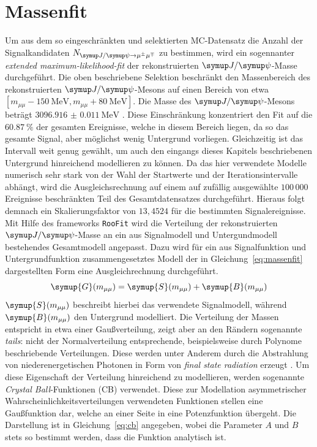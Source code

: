 \section{Massenfit}
\label{sec:massenfit}
Um aus dem so eingeschränkten und selektierten MC-Datensatz die Anzahl der Signalkandidaten $N_{\kontroll}$ zu bestimmen, wird ein sogennanter \textit{extended maximum-likelihood-fit} \cite{extended} der rekonstruierten $\jpsi$-Masse durchgeführt. Die oben
beschriebene Selektion beschränkt den Massenbereich des rekonstruierten $\jpsi$-Mesons auf einen Bereich von etwa
$[m_{\mu\mu}-\SI{150}{\mega\electronvolt}, m_{\mu\mu}+\SI{80}{\mega\electronvolt}]$. Die Masse des $\jpsi$-Mesons beträgt $\SI{3096.916(11)}{\mega\electronvolt}$ \cite{pdg}. Diese Einschränkung konzentriert den Fit auf die $\SI{60.87}{\percent}$ der gesamten Ereignisse, welche in diesem Bereich liegen, da so das gesamte Signal, aber möglichst wenig Untergrund vorliegen. Gleichzeitig ist das Intervall weit genug gewählt, um auch den eingangs dieses Kapitels beschriebenen Untergrund hinreichend modellieren zu können. Da das hier verwendete Modelle numerisch sehr stark von der Wahl der Startwerte und der Iterationsintervalle abhängt, wird die Ausgleichsrechnung auf einem auf zufällig ausgewählte $100\,000$ Ereignisse beschränkten Teil des Gesamtdatensatzes durchgeführt. Hieraus folgt demnach ein Skalierungsfaktor von $13,4524$ für die bestimmten Signalereignisse. \\
%
Mit Hilfe des frameworks \texttt{RooFit} \cite{roofit} wird die Verteilung der rekonstruierten $\jpsi$-Masse an ein aus Signalmodell und Untergundmodell bestehendes Gesamtmodell angepasst. Dazu wird für ein aus Signalfunktion und Untergrundfunktion zusammengesetztes Modell der in Gleichung~\ref{eq:massenfit} dargestellten Form eine Ausgleichrechnung durchgeführt.
%
\begin{equation}
  \symup{G}(m_{\mu\mu})= \symup{S}(m_{\mu\mu}) + \symup{B}(m_{\mu\mu})
  \label{eq:massenfit}
\end{equation}
%
$\symup{S}(m_{\mu\mu})$ beschreibt hierbei das verwendete Signalmodell, während $\symup{B}(m_{\mu\mu})$ den Untergrund modelliert. Die Verteilung der Massen entspricht in etwa einer Gaußverteilung, zeigt aber an den Rändern sogenannte \textit{tails}: nicht der Normalverteilung entsprechende, beispielsweise durch Polynome beschriebende Verteilungen. Diese werden unter Anderem durch die Abstrahlung von niederenergetischen Photonen in Form von \textit{final state radiation} erzeugt \cite{cb}. Um diese Eigenschaft der Verteilung hinreichend zu modellieren, werden sogenannte \textit{Crystal Ball}-Funktionen (CB) verwendet. Diese zur Modellation asymmetrischer Wahrscheinlichkeitsverteilungen verwendeten Funktionen stellen eine Gaußfunktion dar, welche an einer Seite in eine Potenzfunktion übergeht. Die Darstellung ist in Gleichung~\ref{eq:cb} \cite{cb} angegeben, wobei die Parameter $A$ und $B$ stets so bestimmt werden, dass die Funktion analytisch ist.
